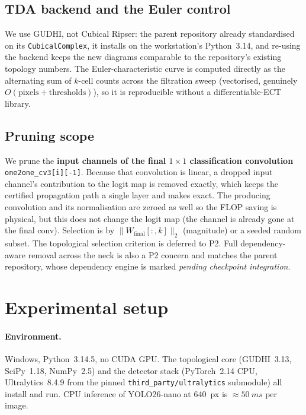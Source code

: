 \documentclass[11pt]{article}
\newcommand{\code}[1]{\texttt{\small #1}}
\theoremstyle{definition}
\theoremstyle{plain}
\begin{document}
\subsection{TDA backend and the Euler control}

We use GUDHI, not Cubical Ripser: the parent repository already standardised on
its \code{CubicalComplex}, it installs on the workstation's Python~3.14, and
re-using the backend keeps the new diagrams comparable to the repository's
existing topology numbers. The Euler-characteristic curve is computed directly as
the alternating sum of $k$-cell counts across the filtration sweep (vectorised,
genuinely $O(\text{pixels} + \text{thresholds})$), so it is reproducible without
a differentiable-ECT library.

\subsection{Pruning scope}
\label{sec:pruning}

We prune the \textbf{input channels of the final $1\times1$ classification
convolution} \code{one2one\_cv3[i][-1]}. Because that convolution is linear, a
dropped input channel's contribution to the logit map is removed exactly, which
keeps the certified propagation path a single layer and makes 
exact. The producing convolution and its normalisation are zeroed as well so the
FLOP saving is physical, but this does not change the logit map (the channel is
already gone at the final conv). Selection is by $\lVert W_{\text{final}}[:,k]
\rVert_2$ (magnitude) or a seeded random subset. The topological selection
criterion is deferred to P2. Full dependency-aware removal across the neck is
also a P2 concern and matches the parent repository, whose dependency engine is
marked \emph{pending checkpoint integration}.

\section{Experimental setup}
\label{sec:setup}

\paragraph{Environment.} Windows, Python~3.14.5, no CUDA GPU. The topological core
(GUDHI~3.13, SciPy~1.18, NumPy~2.5) and the detector stack (PyTorch~2.14 CPU,
Ultralytics~8.4.9 from the pinned \code{third\_party/ultralytics} submodule) all
install and run. CPU inference of YOLO26-nano at \SI{640}{px} is
$\approx\SI{50}{ms}$ per image.
\end{document}

